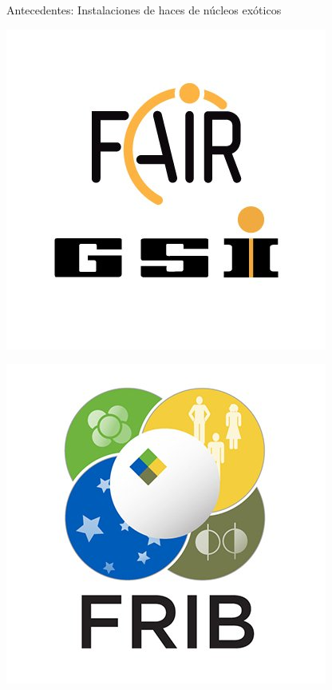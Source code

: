 \documentclass{beamer}
\begin{document}
\begin{frame}{Antecedentes: Instalaciones de haces de núcleos exóticos} 
    \begin{minipage}{0.45\textwidth}
    \begin{center}
    \includegraphics[height=0.3\textheight]{fair.jpg}
    \end{center}
    \end{minipage}
    \begin{minipage}{0.45\textwidth}
    \begin{center}
    \includegraphics[height=0.3\textheight]{frib.jpg}
    \end{center}
    \end{minipage}


\end{frame}
\end{document}
